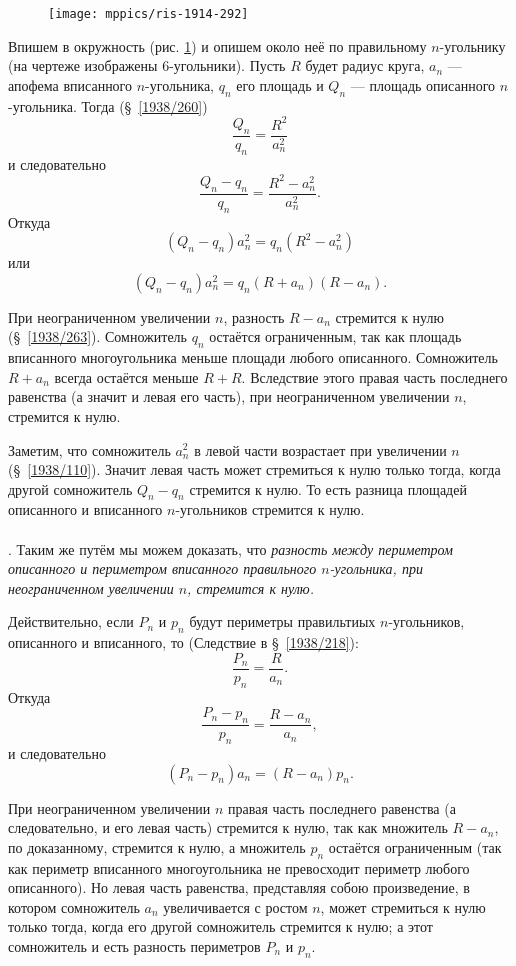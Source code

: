 \documentclass[twoside]{book}
\begin{document}
\begin{figure}
\centering
\texttt{[image: mppics/ris-1914-292]}
\caption{}\label{1914/ris-292}
\end{figure}

Впишем в окружность (рис. \ref{1914/ris-292}) и опишем около неё по правильному $n$-угольнику (на чертеже изображены $6$-угольники).
Пусть $R$ будет радиус круга, $a_n$ — апофема вписанного $n$-угольника, $q_n$ его площадь и $Q_n$ — площадь описанного $n$-угольника.
Тогда (§~\ref{1938/260})
\[\frac {Q_n}{q_n}=\frac{R^2}{a_n^2}\]
и следовательно 
\[\frac {Q_n-q_n}{q_n}=\frac{R^2-a_n^2}{a_n^2}.\]
Откуда
\[(Q_n-q_n)a_n^2=q_n(R^2-a_n^2)\]
или
\[(Q_n-q_n)a_n^2=q_n(R+a_n)(R-a_n).\]

При неограниченном увеличении $n$, разность $R-a_n$ стремится к нулю (§~\ref{1938/263}).
Сомножитель $q_n$ остаётся ограниченным, так как площадь вписанного многоугольника меньше площади любого описанного.  
Сомножитель $R+a_n$ всегда остаётся меньше $R+R$.
Вследствие этого правая часть последнего равенства (а значит и левая его часть),
при неограниченном увеличении $n$, стремится к нулю.

Заметим, что сомножитель $a_n^2$ в левой части возрастает при увеличении $n$ (§~\ref{1938/110}).
Значит левая часть может стремиться к нулю только тогда, когда другой сомножитель $Q_n-q_n$ стремится к нулю.
То есть разница площадей описанного и вписанного $n$-угольников стремится к нулю.

\paragraph{}\label{1914/231}
.
Таким же путём мы можем доказать, что \emph{разность между периметром описанного и
периметром вписанного правильного $n$-угольника, при неограниченном увеличении $n$, стремится к нулю.}

Действительно, если $P_n$ и $p_n$ будут периметры правильтиых $n$-угольников, описанного и вписанного, то (Следствие в §~\ref{1938/218}):
\[\frac {P_n}{p_n}=\frac R{a_n}.\]
Откуда
\[\frac{P_n-p_n}{p_n}=\frac{R-a_n}{a_n},\]
и следовательно
\[(P_n-p_n)a_n=(R-a_n)p_n.\]

При неограниченном увеличении $n$ правая часть последнего равенства (а следовательно, и его левая часть) стремится к нулю, так как множитель $R-a_n$, по доказанному, стремится к нулю, а множитель $p_n$ остаётся ограниченным (так как периметр вписанного многоугольника не превосходит периметр любого описанного).
Но левая часть равенства, представляя собою произведение, в котором сомножитель $a_n$ увеличивается с ростом $n$, может стремиться к нулю только тогда, когда его другой сомножитель  стремится к нулю;
а этот сомножитель и есть разность периметров $P_n$ и $p_n$.
\end{document}

